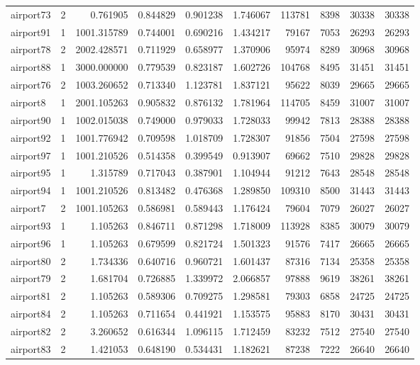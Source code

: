 \documentclass[../../../thesis.tex]{subfiles}
\begin{document}
\begin{longtable}{|l|r|r|r|r|r|r|r|r|r|}
airport73 & 2 & 0.761905 & 0.844829 & 0.901238 & 1.746067 & 113781 & 8398 & 30338 & 30338 \\
airport91 & 1 & 1001.315789 & 0.744001 & 0.690216 & 1.434217 & 79167 & 7053 & 26293 & 26293 \\
airport78 & 2 & 2002.428571 & 0.711929 & 0.658977 & 1.370906 & 95974 & 8289 & 30968 & 30968 \\
airport88 & 1 & 3000.000000 & 0.779539 & 0.823187 & 1.602726 & 104768 & 8495 & 31451 & 31451 \\
airport76 & 2 & 1003.260652 & 0.713340 & 1.123781 & 1.837121 & 95622 & 8039 & 29665 & 29665 \\
airport8 & 1 & 2001.105263 & 0.905832 & 0.876132 & 1.781964 & 114705 & 8459 & 31007 & 31007 \\
airport90 & 1 & 1002.015038 & 0.749000 & 0.979033 & 1.728033 & 99942 & 7813 & 28388 & 28388 \\
airport92 & 1 & 1001.776942 & 0.709598 & 1.018709 & 1.728307 & 91856 & 7504 & 27598 & 27598 \\
airport97 & 1 & 1001.210526 & 0.514358 & 0.399549 & 0.913907 & 69662 & 7510 & 29828 & 29828 \\
airport95 & 1 & 1.315789 & 0.717043 & 0.387901 & 1.104944 & 91212 & 7643 & 28548 & 28548 \\
airport94 & 1 & 1001.210526 & 0.813482 & 0.476368 & 1.289850 & 109310 & 8500 & 31443 & 31443 \\
airport7 & 2 & 1001.105263 & 0.586981 & 0.589443 & 1.176424 & 79604 & 7079 & 26027 & 26027 \\
airport93 & 1 & 1.105263 & 0.846711 & 0.871298 & 1.718009 & 113928 & 8385 & 30079 & 30079 \\
airport96 & 1 & 1.105263 & 0.679599 & 0.821724 & 1.501323 & 91576 & 7417 & 26665 & 26665 \\
airport80 & 2 & 1.734336 & 0.640716 & 0.960721 & 1.601437 & 87316 & 7134 & 25358 & 25358 \\
airport79 & 2 & 1.681704 & 0.726885 & 1.339972 & 2.066857 & 97888 & 9619 & 38261 & 38261 \\
airport81 & 2 & 1.105263 & 0.589306 & 0.709275 & 1.298581 & 79303 & 6858 & 24725 & 24725 \\
airport84 & 2 & 1.105263 & 0.711654 & 0.441921 & 1.153575 & 95883 & 8170 & 30431 & 30431 \\
airport82 & 2 & 3.260652 & 0.616344 & 1.096115 & 1.712459 & 83232 & 7512 & 27540 & 27540 \\
airport83 & 2 & 1.421053 & 0.648190 & 0.534431 & 1.182621 & 87238 & 7222 & 26640 & 26640 \\

\end{longtable}
\end{document}
